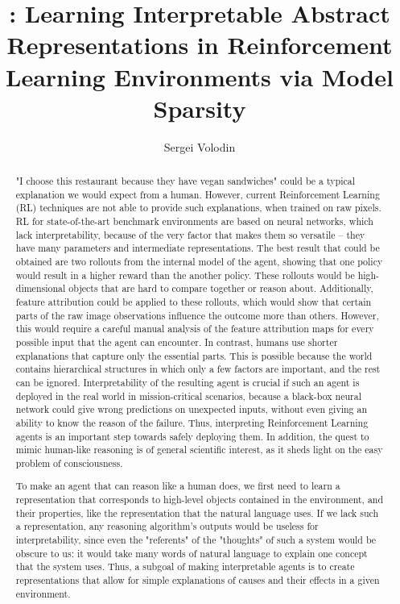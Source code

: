 \documentclass[a4paper,11pt,oneside]{report}
\title{\sysname: Learning Interpretable Abstract Representations in Reinforcement Learning Environments via Model Sparsity}
\author{Sergei Volodin}
\begin{document}
    \maketitle
    \makededication
    \makeacks

\begin{abstract}

"I choose this restaurant because they have vegan sandwiches" could be a typical explanation we would expect from a human. However, current Reinforcement Learning (RL) techniques are not able to provide such explanations, when trained on raw pixels.
RL for state-of-the-art benchmark environments are based on neural networks, which lack interpretability, because of the very factor that makes them so versatile -- they have many parameters and intermediate representations.
The best result that could be obtained are two rollouts from the internal model of the agent, showing that one policy would result in a higher reward than the another policy. These rollouts would be high-dimensional objects that are hard to compare together or reason about.
Additionally, feature attribution could be applied to these rollouts, which would show that certain parts of the raw image observations influence the outcome more than others. However, this would require a careful manual analysis of the feature attribution maps for every possible input that the agent can encounter.
In contrast, humans use shorter explanations that capture only the essential parts. This is possible because the world contains hierarchical structures in which only a few factors are important, and the rest can be ignored.
Interpretability of the resulting agent is crucial if such an agent is deployed in the real world in mission-critical scenarios, because a black-box neural network could give wrong predictions on unexpected inputs, without even giving an ability to know the reason of the failure. Thus, interpreting Reinforcement Learning agents is an important step towards safely deploying them.
In addition, the quest to mimic human-like reasoning is of general scientific interest, as it sheds light on the easy problem of consciousness.

To make an agent that can reason like a human does, we first need to learn a representation that corresponds to high-level objects contained in the environment, and their properties, like the representation that the natural language uses. If we lack such a representation, any reasoning algorithm's outputs would be useless for interpretability, since even the "referents" of the "thoughts" of such a system would be obscure to us: it would take many words of natural language to explain one concept that the system uses. Thus, a subgoal of making interpretable agents is to create representations that allow for simple explanations of causes and their effects in a given environment.


\end{abstract}
\end{document}
